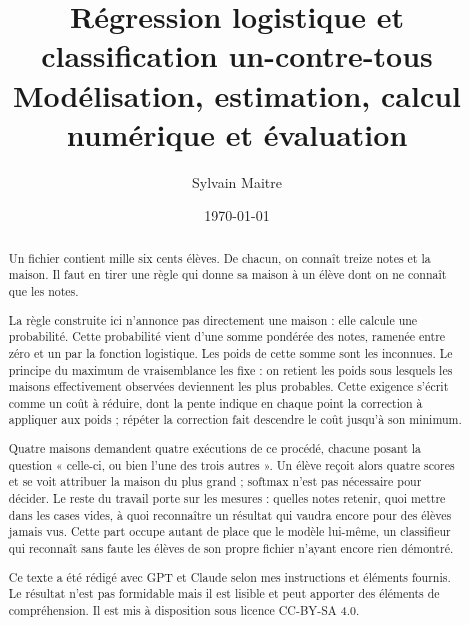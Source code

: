 \documentclass[12pt,a4paper,openany]{report}
\title{\textbf{Régression logistique et classification un-contre-tous}\\
  \large Modélisation, estimation, calcul numérique et évaluation}
\author{Sylvain Maitre}
\date{\today}
\begin{document}
\hypersetup{pageanchor=false}
\maketitle
{}

\begin{abstract}
Un fichier contient mille six cents élèves. De chacun, on connaît treize notes et
la maison. Il faut en tirer une règle qui donne sa maison à un élève dont on ne
connaît que les notes.

La règle construite ici n'annonce pas directement une maison : elle calcule une
probabilité. Cette probabilité vient d'une somme pondérée des notes, ramenée
entre zéro et un par la fonction logistique. Les poids de cette somme sont les
inconnues. Le principe du maximum de vraisemblance les fixe : on retient les
poids sous lesquels les maisons effectivement observées deviennent les plus
probables. Cette exigence s'écrit comme un coût à réduire, dont la pente indique
en chaque point la correction à appliquer aux poids ; répéter la correction fait
descendre le coût jusqu'à son minimum.

Quatre maisons demandent quatre exécutions de ce procédé, chacune posant la
question « celle-ci, ou bien l'une des trois autres ». Un élève reçoit alors
quatre scores et se voit attribuer la maison du plus grand ; softmax n'est pas
nécessaire pour décider. Le reste du travail porte sur les mesures : quelles
notes retenir, quoi mettre dans les cases vides, à quoi reconnaître un résultat
qui vaudra encore pour des élèves jamais vus. Cette part occupe autant de place
que le modèle lui-même, un classifieur qui reconnaît sans faute les élèves de
son propre fichier n'ayant encore rien démontré.

Ce texte a été rédigé avec GPT et Claude selon mes instructions et éléments fournis. Le résultat n'est pas formidable mais il est lisible et peut apporter des éléments de compréhension. Il est mis à disposition sous licence CC-BY-SA 4.0.
\end{abstract}

\tableofcontents
\clearpage
{}
\hypersetup{pageanchor=true}











\appendix


\printbibliography[title={Références citées},notcategory=reading]
\nocite{bishop2006,ng2018cs229,murphy2022,james2023,
  openintro2024,stanfordcs109,psustat504}
\printbibliography[title={Lectures complémentaires},category=reading]
\end{document}
